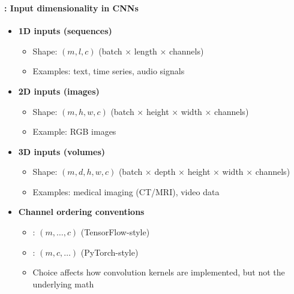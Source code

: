\documentclass[xcolor=table]{beamer}
\begin{document}
\begin{frame}
	\frametitle{\insertshortsubtitle}
	\framesubtitle{\insertsection: Input dimensionality in CNNs}
	
	\begin{itemize}
		
		
		\item \textbf{1D inputs (sequences)}
		\begin{itemize}
			\item Shape: $(m, l, c)$ (batch × length × channels)
			\item Examples: text, time series, audio signals
		\end{itemize}
		
		\item \textbf{2D inputs (images)}
		\begin{itemize}
			\item Shape: $(m, h, w, c)$ (batch × height × width × channels)
			\item Example: RGB images
		\end{itemize}
		
		\item \textbf{3D inputs (volumes)}
		\begin{itemize}
			\item Shape: $(m, d, h, w, c)$ (batch × depth × height × width × channels)
			\item Examples: medical imaging (CT/MRI), video data
		\end{itemize}
		
		\item \textbf{Channel ordering conventions}
		\begin{itemize}
			\item {}: $(m, \dots, c)$ (TensorFlow-style)
			\item {}: $(m, c, \dots)$ (PyTorch-style)
			\item Choice affects how convolution kernels are implemented, but not the underlying math
		\end{itemize}
		
	\end{itemize}
	
\end{frame}
\end{document}
